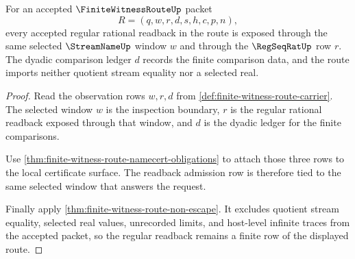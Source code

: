 \begin{theorem}
\label{thm:finite-witness-route-regular-readback-admission}
For an accepted $\FiniteWitnessRouteUp$ packet
$$
R=(q,w,r,d,s,h,c,p,n),
$$
every accepted regular rational readback in the route is exposed through the same selected $\StreamNameUp$ window $w$ and through the $\RegSeqRatUp$ row $r$. The dyadic comparison ledger $d$ records the finite comparison data, and the route imports neither quotient stream equality nor a selected real.
\end{theorem}
\begin{proof}
Read the observation rows $w,r,d$ from \autoref{def:finite-witness-route-carrier}. The selected window $w$ is the inspection boundary, $r$ is the regular rational readback exposed through that window, and $d$ is the dyadic ledger for the finite comparisons.

Use \autoref{thm:finite-witness-route-namecert-obligations} to attach those three rows to the local certificate surface. The readback admission row is therefore tied to the same selected window that answers the request.

Finally apply \autoref{thm:finite-witness-route-non-escape}. It excludes quotient stream equality, selected real values, unrecorded limits, and host-level infinite traces from the accepted packet, so the regular readback remains a finite row of the displayed route.
\end{proof}

